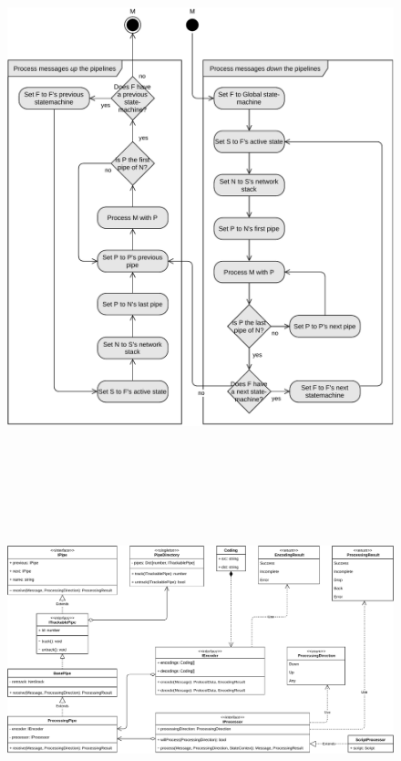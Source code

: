 \begin{figure}[t]
    \centering
    \includegraphics[width=14cm]{img/ch05/activity-nested-fsms.pdf}
    \label{fig:app-activity-fsms}
\end{figure}

\begin{figure}
    \centering
    \includegraphics[height=12cm]{img/ch05/classes-2-pipes.pdf}
    \label{fig:app-classes-2-pipes}
\end{figure}

